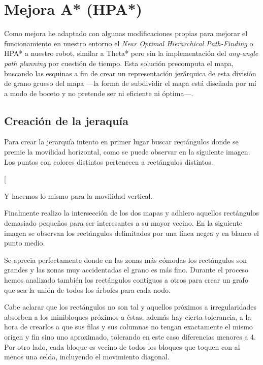 \documentclass{article}
\newcommand{\img}[1]{
\noindent\makebox[\textwidth][c]{\texttt{[image: \#1]}}%
}
\begin{document}
\section{Mejora A* (HPA*)}

Como mejora he adaptado con algunas modificaciones propias para mejorar el funcionamiento en nuestro entorno el \emph{Near Optimal Hierarchical Path-Finding} o HPA* a nuestro robot, similar a Theta* pero sin la implementación del \emph{any-angle path planning} por cuestión de tiempo. Esta solución precomputa el mapa, buscando las esquinas a fin de crear un representación jerárquica de esta división de grano grueso del mapa ---la forma de subdividir el mapa está diseñada por mí a modo de boceto y no pretende ser ni eficiente ni óptima---.

\subsection{Creación de la jeraquía}

Para crear la jerarquía intento en primer lugar buscar rectángulos donde se premie la movilidad horizontal, como se puede observar en la siguiente imagen. Los puntos con colores distintos pertenecen a rectángulos distintos.

\img{rowMap}[

Y hacemos lo mismo para la movilidad vertical.

\img{colMap}

Finalmente realizo la intersección de los dos mapas y adhiero aquellos rectángulos demasiado pequeños para ser interesantes a su mayor vecino. En la siguiente imagen se observan los rectángulos delimitados por una línea negra y en blanco el punto medio.

\img{borderMap}

Se aprecia perfectamente donde en las zonas más cómodas los rectángulos son grandes y las zonas muy accidentadas el grano es más fino. Durante el proceso hemos analizado también los rectángulos contiguos a otros para crear un grafo que sea la unión de todos los árboles para cada nodo.

Cabe aclarar que los rectángulos no son tal y aquellos próximos a irregularidades absorben a los minibloques próximos a éstas, además hay cierta tolerancia, a la hora de crearlos a que sus filas y sus columnas no tengan exactamente el mismo origen y fin sino uno aproximado, tolerando en este caso diferencias menores a 4. Por otro lado, cada bloque es vecino de todos los bloques que toquen con al menos una celda, incluyendo el movimiento diagonal.
\end{document}
